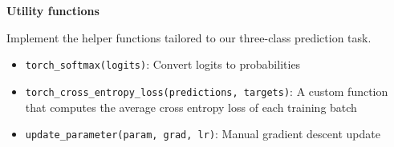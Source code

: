 \item {} \textbf{Utility functions}

Implement the helper functions tailored to our three-class prediction task.

\begin{itemize}
    \item \texttt{torch\_softmax(logits)}: Convert logits to probabilities
    \item \texttt{torch\_cross\_entropy\_loss(predictions, targets)}: A custom function that computes the average cross entropy loss of each training batch
    \item \texttt{update\_parameter(param, grad, lr)}: Manual gradient descent update
\end{itemize}